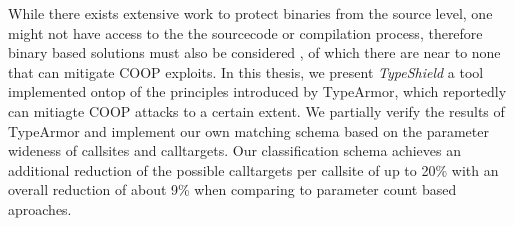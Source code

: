 While there exists extensive work to protect binaries from the source level, one might not have access to the the sourcecode or compilation process, therefore binary based solutions must also be considered , of which there are near to none that can mitigate COOP exploits. In this thesis, we present \textit{TypeShield} a tool implemented ontop of the principles introduced by TypeArmor, which reportedly can mitiagte COOP attacks to a certain extent. We partially verify the results of TypeArmor and implement our own matching schema based on the parameter wideness of callsites and calltargets. Our classification schema achieves an additional reduction of the possible calltargets per callsite of up to 20\% with an overall reduction of about 9\% when comparing to parameter count based aproaches.
%
%
%
%
